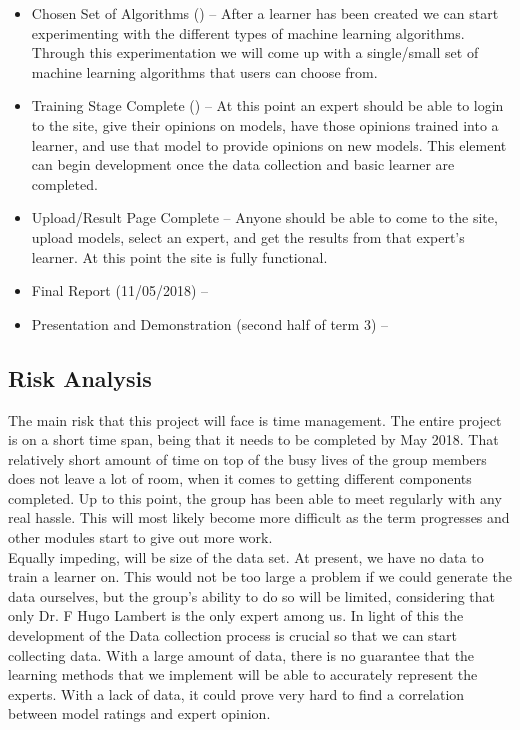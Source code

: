 \documentclass{ecmm427_assignment}
\begin{document}
\begin{itemize}
\item Chosen Set of Algorithms () – After a learner has been created we can start experimenting with the different types of machine learning algorithms. Through this experimentation we will come up with a single/small set of machine learning algorithms that users can choose from.

\item Training Stage Complete () – At this point an expert should be able to login to the site, give their opinions on models, have those opinions trained into a learner, and use that model to provide opinions on new models. This element can begin development once the data collection and basic learner are completed.

\item Upload/Result Page Complete – Anyone should be able to come to the site, upload models, select an expert, and get the results from that expert’s learner. At this point the site is fully functional.

\item Final Report (11/05/2018) –

\item Presentation and Demonstration (second half of term 3) –

\end{itemize}

\subsection{Risk Analysis}

\quad The main risk that this project will face is time management. The entire project is on a short time span, being that it needs to be completed by May 2018. That relatively short amount of time on top of the busy lives of the group members does not leave a lot of room, when it comes to getting different components completed. Up to this point, the group has been able to meet regularly with any real hassle. This will most likely become more difficult as the term progresses and other modules start to give out more work. \\

\quad Equally impeding, will be size of the data set. At present, we have no data to train a learner on. This would not be too large a problem if we could generate the data ourselves, but the group’s ability to do so will be limited, considering that only Dr. F Hugo Lambert is the only expert among us. In light of this the development of the Data collection process is crucial so that we can start collecting data. With a large amount of data, there is no guarantee that the learning methods that we implement will be able to accurately represent the experts. With a lack of data, it could prove very hard to find a correlation between model ratings and expert opinion.\\
\end{document}
